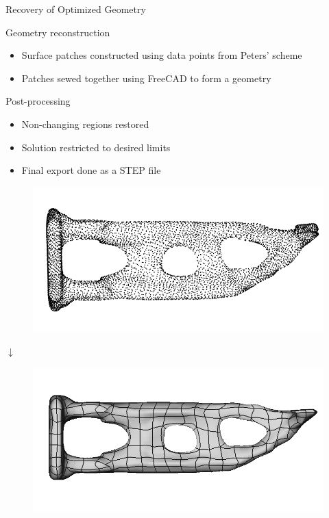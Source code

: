 \begin{frame}{Recovery of Optimized Geometry}
	\begin{minipage}[t]{0.5\linewidth}
		\begin{block}{Geometry reconstruction}
			\begin{itemize}
				\item Surface patches constructed using data points from Peters' scheme \\
				\item Patches sewed together using FreeCAD to form a geometry \\
			\end{itemize}
		\end{block}
		\begin{block}{Post-processing}
			\begin{itemize}
				\item Non-changing regions restored \\
				\item Solution restricted to desired limits \\
				\item Final export done as a STEP file
			\end{itemize}
		\end{block}
	\end{minipage}
	\hfill
	\begin{minipage}[t]{0.45\linewidth}
		\vspace{-0.25cm}
		\begin{figure}
			\includegraphics[width=.88\textwidth]{Pictures/SecondHalf/Back2CAD1}
		\end{figure}
		\vspace{-0.75cm}
		\begin{center}
			$\downarrow$
		\end{center}
		\vspace{-0.6cm}
		\begin{figure}
			\includegraphics[width=.88\textwidth]{Pictures/SecondHalf/Back2CAD2}

\end{figure}
\end{minipage}
\end{frame}
